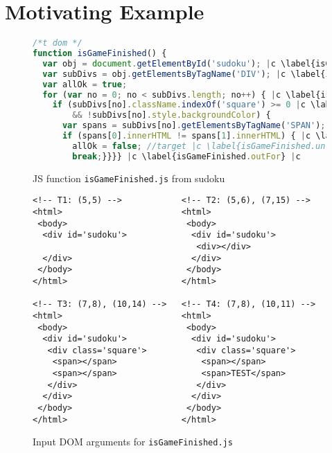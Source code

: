 \section{Motivating Example}
\label{sec.example}

\begin{figure}[!t]
  \begin{lstlisting}[style=htmlcssjs,language=JavaScript]
/*t dom */
function isGameFinished() {
  var obj = document.getElementById('sudoku'); |c \label{isGameFinished.getSudoku} |c
  var subDivs = obj.getElementsByTagName('DIV'); |c \label{isGameFinished.getDivs} |c
  var allOk = true;
  for (var no = 0; no < subDivs.length; no++) { |c \label{isGameFinished.inFor.begin} |c
    if (subDivs[no].className.indexOf('square') >= 0 |c \label{isGameFinished.if1.begin} |c
        && !subDivs[no].style.backgroundColor) {
      var spans = subDivs[no].getElementsByTagName('SPAN');
      if (spans[0].innerHTML != spans[1].innerHTML) { |c \label{isGameFinished.if2.begin} |c
        allOk = false; //target |c \label{isGameFinished.unfinished} |c
        break;}}}} |c \label{isGameFinished.outFor} |c
\end{lstlisting}
  \caption{JS function \texttt{isGameFinished.js} from sudoku}
  \label{code.isGameFinished}
\end{figure}

\begin{figure}[!t]
  \begin{lstlisting}[style=htmlcssjs, language=HTML5]
<!-- T1: (5,5) -->            <!-- T2: (5,6), (7,15) -->
<html>                        <html>
 <body>                        <body>
  <div id='sudoku'>             <div id='sudoku'>
                                 <div></div>
  </div>                        </div>
 </body>                       </body>
</html>                       </html>

<!-- T3: (7,8), (10,14) -->   <!-- T4: (7,8), (10,11) -->
<html>                        <html>
 <body>                        <body>
  <div id='sudoku'>             <div id='sudoku'>
   <div class='square'>          <div class='square'>
    <span></span>                 <span></span>
    <span></span>                 <span>TEST</span>
   </div>                        </div>
  </div>                        </div>
 </body>                       </body>
</html>                       </html>
  \end{lstlisting}
  \caption{Input DOM arguments for \texttt{isGameFinished.js}}
  \label{fig.isGameFinished.tests}
\end{figure}

